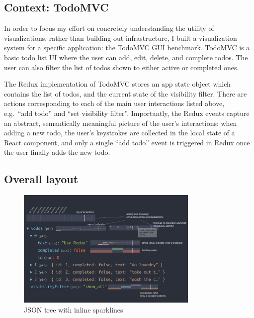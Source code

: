 \documentclass{sigchi}
\begin{document}
\hypertarget{context-todomvc}{%
\subsection{Context: TodoMVC}\label{context-todomvc}}

In order to focus my effort on concretely understanding the utility of
visualizations, rather than building out infrastructure, I built a
visualization system for a specific application: the TodoMVC GUI
benchmark. TodoMVC is a basic todo list UI where the user can add, edit,
delete, and complete todos. The user can also filter the list of todos
shown to either active or completed ones.

The Redux implementation of TodoMVC stores an app state object which
contains the list of todos, and the current state of the visibility
filter. There are actions corresponding to each of the main user
interactions listed above, e.g.~``add todo'' and ``set visibility
filter''. Importantly, the Redux events capture an abstract,
semantically meaningful picture of the user's interactions: when adding
a new todo, the user's keystrokes are collected in the local state of a
React component, and only a single ``add todo'' event is triggered in
Redux once the user finally adds the new todo.

\hypertarget{overall-layout}{%
\subsection{Overall layout}\label{overall-layout}}

\begin{figure}
\hypertarget{fig:mockup}{%
\centering
\includegraphics[width=3.4375in,height=2.25in]{images/mockup.png}
\caption{JSON tree with inline sparklines}\label{fig:mockup}
}
\end{figure}
\end{document}
